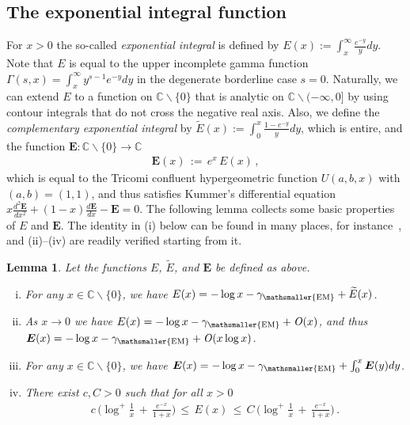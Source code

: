 \documentclass[10pt]{article}
\numberwithin{equation}{section}
\newtheorem{lemma}[theorem]{Lemma}
\theoremstyle{definition}
\newcommand{\C}{{\mathbb C}}
\begin{document}
\subsection{The exponential integral function}\label{SubsecGammaFun}
For $x>0$ the so-called \textit{exponential integral} is defined by  $E(x):=\int_x^{\infty} \frac{e^{-y   }}{y }dy$. Note that $E$ is equal to the  upper incomplete gamma function $\Gamma(s,x)=\int_{x}^{\infty}y^{s-1}e^{-y}dy$ in the degenerate  borderline case $s=0$. Naturally, we can extend $E$ to a function on $\C\backslash \{0\} $  that is analytic on $\C\backslash (-\infty, 0]$ by using
contour integrals that do not cross the negative real axis.  Also, we  define the  \textit{complementary exponential integral}  by $\widetilde{E}(x):= \int_{0}^{x}\frac{1-e^{-y}  }{  y}dy$, which is entire, and the  function   $\boldsymbol{E}: \C\backslash\{0\}\rightarrow \C $ 
 \begin{align*}
 \boldsymbol{E}(x)\,:=\,e^x\,E(x)\,,
 \end{align*}
which is equal to the Tricomi confluent hypergeometric function $U(a,b,x)$ with $(a,b)=(1,1)$, and thus satisfies Kummer's differential equation $x\frac{d^2 \boldsymbol{E} }{ dx^2 }+(1-x)\frac{d \boldsymbol{E} }{ dx } -\boldsymbol{E}=0 $.  The following lemma collects some basic properties of $E$  and  $ \boldsymbol{E}$.  The identity in (i) below can be found in many places, for instance~\cite[Eq.\ 5.1.39]{Abramowitz}, and (ii)--(iv) are readily verified starting from it.
\begin{lemma}\label{LemEM} Let the functions $E$, $\widetilde{E}$, and $\boldsymbol{E}$ be defined as above.
\begin{enumerate}[(i)]
    \item For any $x\in \C\backslash\{0\}$, we have $ E(x)=-\log x-\gamma_{\mathsmaller{\textup{EM}}} +\widetilde{E}(x) $.

  \item  As $x\rightarrow 0$ we have   $E(x)= -\log x-\gamma_{\mathsmaller{\textup{EM}}} +\mathit{O}(x) $,  and thus $\boldsymbol{E}(x)= -\log x-\gamma_{\mathsmaller{\textup{EM}}} +\mathit{O}(x\log x) $.
  


 \item For any $x\in  \C\backslash \{0\}$, we have $ \boldsymbol{E}(x)=-\log x-\gamma_{\mathsmaller{\textup{EM}}} +\int_{0}^x \boldsymbol{E}(y)dy  $.
    
  

    \item   There exist  $c, C>0$ such that for all $x> 0$
\begin{align*}
  c \,\bigg( \log^+ \frac{1}{x}\,+\,\frac{e^{-x}}{1+x} \bigg)  \,\leq \, E(x)\,\leq \, C\, \bigg( \log^+ \frac{1}{x}\,+\,\frac{e^{-x}}{1+x} \bigg)\,.
\end{align*}
    
\end{enumerate}


\end{lemma}
\end{document}

